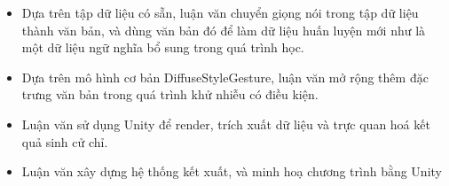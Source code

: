 \begin{itemize}
	\item Dựa trên tập dữ liệu có sẵn, luận văn chuyển giọng nói trong tập dữ liệu thành văn bản, và dùng văn bản đó để làm dữ liệu huấn luyện mới như là một dữ liệu ngữ nghĩa bổ sung trong quá trình học.
	
	\item Dựa trên mô hình cơ bản DiffuseStyleGesture, luận văn mở rộng thêm đặc trưng văn bản trong quá trình khử nhiễu có điều kiện.
	
	\item Luận văn sử dụng Unity để render, trích xuất dữ liệu và trực quan hoá kết quả sinh cử chỉ.
	
	\item Luận văn xây dựng hệ thống kết xuất, và minh hoạ chương trình bằng Unity
\end{itemize}




%	

%



